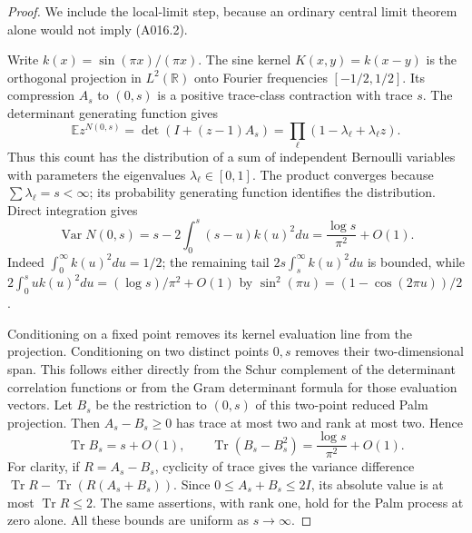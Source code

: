 \begin{proof}
We include the local-limit step, because an ordinary central limit
theorem alone would not imply (A016.2).

Write $k(x)=\sin(\pi x)/(\pi x)$. The sine kernel $K(x,y)=k(x-y)$
is the orthogonal projection in $L^2(\mathbb R)$ onto Fourier
frequencies $[-1/2,1/2]$. Its compression $A_s$ to $(0,s)$ is a
positive trace-class contraction with trace $s$. The determinant
generating function gives
\[
 \mathbb E z^{N(0,s)}=\det(I+(z-1)A_s)
       =\prod_\ell(1-\lambda_\ell+\lambda_\ell z).
\]
Thus this count has the distribution of a sum of independent Bernoulli
variables with parameters the eigenvalues $\lambda_\ell\in[0,1]$.
The product converges because $\sum\lambda_\ell=s<\infty$;
its probability generating function identifies the distribution.
Direct integration gives
\[
 \operatorname{Var}N(0,s)
 =s-2\int_0^s(s-u)k(u)^2du
 =\frac{\log s}{\pi^2}+O(1).                          \tag{A016.3}
\]
Indeed $\int_0^\infty k(u)^2du=1/2$; the remaining tail
$2s\int_s^\infty k(u)^2du$ is bounded, while
$2\int_0^s uk(u)^2du=(\log s)/\pi^2+O(1)$ by
$\sin^2(\pi u)=(1-\cos(2\pi u))/2$.

Conditioning on a fixed point removes its kernel evaluation line
from the projection. Conditioning on two distinct points $0,s$
removes their two-dimensional span. This follows either directly
from the Schur complement of the determinant correlation functions
or from the Gram determinant formula for those evaluation vectors.
Let $B_s$ be the restriction to $(0,s)$ of this two-point reduced
Palm projection. Then $A_s-B_s\ge0$ has trace at most two and rank
at most two. Hence
\[
 \operatorname{Tr}B_s=s+O(1),\qquad
 \operatorname{Tr}(B_s-B_s^2)
       =\frac{\log s}{\pi^2}+O(1).                    \tag{A016.4}
\]
For clarity, if $R=A_s-B_s$, cyclicity of trace gives the variance
difference $\operatorname{Tr}R-\operatorname{Tr}(R(A_s+B_s))$.
Since $0\le A_s+B_s\le2I$, its absolute value is at most
$\operatorname{Tr}R\le2$. The same assertions, with rank one,
hold for the Palm process at zero alone. All these bounds are
uniform as $s\to\infty$.


\end{proof}
